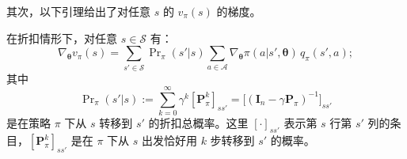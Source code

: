 \documentclass[UTF8]{article}
\begin{document}
其次，以下引理给出了对任意 $s$ 的 $v_\pi(s)$ 的梯度。

\begin{theorembox}[9.2 $v_\pi(s)$ 的梯度]
    在折扣情形下，对任意 $s \in \mathcal{S}$ 有：
    \begin{equation}
    \nabla_{\boldsymbol{\theta}} v_\pi(s) = \sum_{s' \in \mathcal{S}} \Pr\nolimits_\pi(s'|s) \sum_{a \in \mathcal{A}} \nabla_{\boldsymbol{\theta}} \pi(a|s', \boldsymbol{\theta}) \, q_\pi(s', a); \label{eq:grad_v}
    \end{equation}
    其中
    \[
    \Pr\nolimits_\pi(s'|s) := \sum_{k=0}^{\infty} \gamma^k [\boldsymbol{P}_\pi^k]_{ss'} = \bigl[ (\boldsymbol{I}_n - \gamma \boldsymbol{P}_\pi)^{-1} \bigr]_{ss'}
    \]
    是在策略 $\pi$ 下从 $s$ 转移到 $s'$ 的折扣总概率。这里 $[\cdot]_{ss'}$ 表示第 $s$ 行第 $s'$ 列的条目，$[\boldsymbol{P}_\pi^k]_{ss'}$ 是在 $\pi$ 下从 $s$ 出发恰好用 $k$ 步转移到 $s'$ 的概率。
\end{theorembox}
\end{document}
